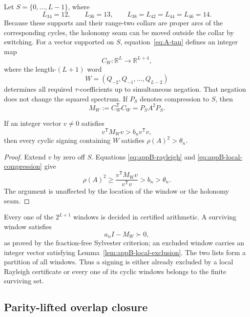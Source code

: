 Let \(S=\{0,\ldots,L-1\}\), where
\begin{equation}\label{eq:appB-support-lengths}
 L_{34}=12,\qquad L_{36}=13,\qquad
 L_{38}=L_{42}=L_{44}=L_{46}=14.
\end{equation}
Because these supports and their range-two collars are proper arcs of the
corresponding cycles, the holonomy seam can be moved outside the collar by
switching.  For a vector supported on \(S\), equation~\eqref{eq:A-tau}
defines an integer map
\[
 C_W:\mathbb R^L\longrightarrow\mathbb R^{L+4},
\]
where the length-\((L+1)\) word
\[
 W=(Q_{-2},Q_{-1},\ldots,Q_{L-2})
\]
determines all required \(\tau\)-coefficients up to simultaneous negation.
That negation does not change the squared spectrum.  If \(P_S\) denotes
compression to \(S\), then
\begin{equation}\label{eq:appB-local-compression}
 M_W:=C_W^{\mathsf T}C_W=P_SA^2P_S.
\end{equation}

\begin{lemma}\label{lem:appB-local-exclusion}
If an integer vector \(v\ne0\) satisfies
\[
 v^{\mathsf T}M_Wv>b_n v^{\mathsf T}v,
\]
then every cyclic signing containing \(W\) satisfies
\(\rho(A)^2>\theta_n\).
\end{lemma}

\begin{proof}
Extend \(v\) by zero off \(S\).  Equations
\eqref{eq:appB-rayleigh} and \eqref{eq:appB-local-compression} give
\[
 \rho(A)^2\geq
 \frac{v^{\mathsf T}M_Wv}{v^{\mathsf T}v}
 >b_n>\theta_n.
\]
The argument is unaffected by the location of the window or the holonomy
seam.
\end{proof}

Every one of the \(2^{L+1}\) windows is decided in certified arithmetic. A
surviving window satisfies
\[
 a_nI-M_W\succ0,
\]
as proved by the fraction-free Sylvester criterion; an excluded window carries an
integer vector satisfying Lemma~\ref{lem:appB-local-exclusion}.  The two
lists form a partition of all windows.  Thus a signing is either already
excluded by a local Rayleigh certificate or every one of its cyclic windows
belongs to the finite surviving set.

\subsection{Parity-lifted overlap closure}
\label{app:parity-overlap}

